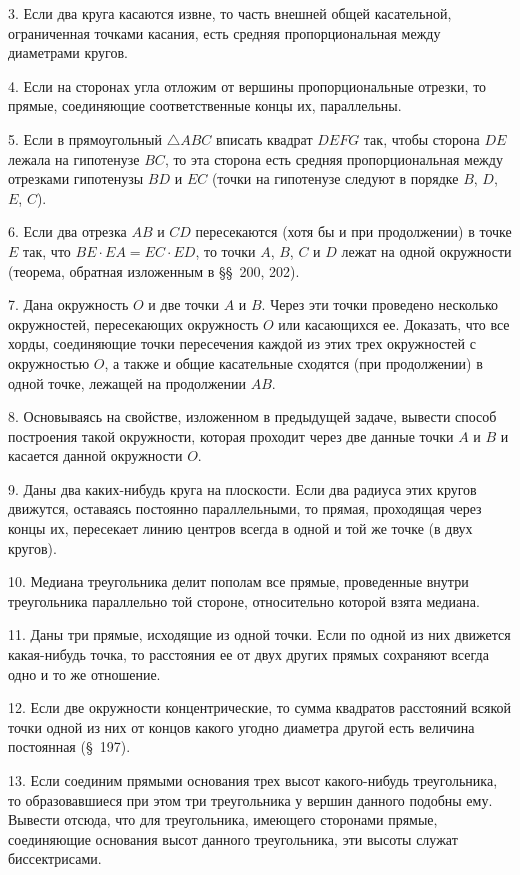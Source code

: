 \documentclass[oneside]{book}
\begin{document}
3.
Если два круга касаются извне, то часть внешней общей касательной, ограниченная точками касания, есть средняя пропорциональная между диаметрами кругов.

4.
Если на сторонах угла отложим от вершины пропорциональные отрезки, то прямые, соединяющие соответственные концы их, параллельны.

5.
Если в прямоугольный $\triangle ABC$ вписать квадрат $DEFG$ так, чтобы сторона $DE$ лежала на гипотенузе $BC$, то эта сторона есть средняя пропорциональная между отрезками гипотенузы $BD$ и $EC$ (точки на гипотенузе следуют в порядке $B$, $D$, $E$, $C$).

6.
Если два отрезка $AB$ и $CD$ пересекаются (хотя бы и при продолжении) в точке $E$ так, что $BE\cdot  EA=EC\cdot  ED$, то точки $A$, $B$, $C$ и $D$ лежат на одной окружности (теорема, обратная изложенным в §§~200, 202).

7.
Дана окружность $O$ и две точки $A$ и $B$.
Через эти точки проведено несколько окружностей, пересекающих окружность $O$ или касающихся ее.
Доказать, что все хорды, соединяющие точки пересечения каждой из этих трех окружностей с окружностью $O$, а также и общие касательные сходятся (при продолжении) в одной точке, лежащей на продолжении $AB$.

8.
Основываясь на свойстве, изложенном в предыдущей задаче, вывести способ построения такой окружности, которая проходит через две данные точки $A$ и $B$ и касается данной окружности $O$.

9.
Даны два каких-нибудь круга на плоскости.
Если два радиуса этих кругов движутся, оставаясь постоянно параллельными, то прямая, проходящая через концы их, пересекает линию центров всегда в одной и той же точке (в  двух кругов).

10.
Медиана треугольника делит пополам все прямые, проведенные внутри треугольника параллельно той стороне, относительно которой взята медиана.

11.
Даны три прямые, исходящие из одной точки.
Если по одной из них движется какая-нибудь точка, то расстояния ее от двух других прямых сохраняют всегда одно и то же отношение.

12.
Если две окружности концентрические, то сумма квадратов расстояний всякой точки одной из них от концов какого угодно диаметра другой есть величина постоянная (§~197).

13.
Если соединим прямыми основания трех высот какого-нибудь треугольника, то образовавшиеся при этом три треугольника у вершин данного подобны ему.
Вывести отсюда, что для треугольника, имеющего сторонами прямые, соединяющие основания высот данного треугольника, эти высоты служат биссектрисами.
\end{document}
